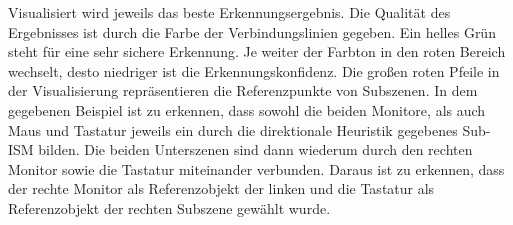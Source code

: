 Visualisiert wird jeweils das beste Erkennungsergebnis.
Die Qualität des Ergebnisses ist durch die Farbe der Verbindungslinien gegeben.
Ein helles Grün steht für eine sehr sichere Erkennung. Je weiter der Farbton in den roten Bereich wechselt, desto niedriger ist die Erkennungskonfidenz.
Die großen roten Pfeile in der Visualisierung repräsentieren die Referenzpunkte von Subszenen.
In dem gegebenen Beispiel ist zu erkennen, dass sowohl die beiden Monitore, als auch Maus und Tastatur jeweils ein durch die direktionale Heuristik gegebenes Sub-ISM bilden.
Die beiden Unterszenen sind dann wiederum durch den rechten Monitor sowie die Tastatur miteinander verbunden.
Daraus ist zu erkennen, dass der rechte Monitor als Referenzobjekt der linken und die Tastatur als Referenzobjekt der rechten Subszene gewählt wurde.
